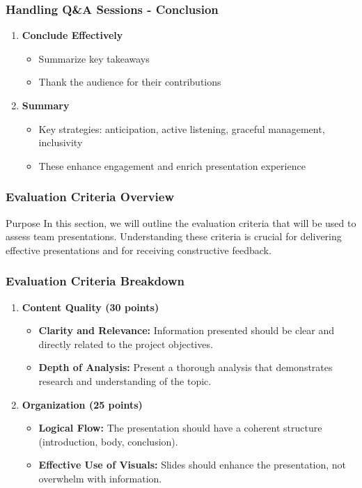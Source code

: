 \documentclass[aspectratio=169]{beamer}
\begin{document}
\begin{frame}[fragile]
    \frametitle{Handling Q\&A Sessions - Conclusion}
    \begin{enumerate}
        \item \textbf{Conclude Effectively}
            \begin{itemize}
                \item Summarize key takeaways
                \item Thank the audience for their contributions
            \end{itemize}
        \item \textbf{Summary}
            \begin{itemize}
                \item Key strategies: anticipation, active listening, graceful management, inclusivity
                \item These enhance engagement and enrich presentation experience
            \end{itemize}
    \end{enumerate}
\end{frame}

\begin{frame}[fragile]
    \frametitle{Evaluation Criteria Overview}
    \begin{block}{Purpose}
        In this section, we will outline the evaluation criteria that will be used to assess team presentations. 
        Understanding these criteria is crucial for delivering effective presentations and for receiving constructive feedback.
    \end{block}
\end{frame}

\begin{frame}[fragile]
    \frametitle{Evaluation Criteria Breakdown}
    \begin{enumerate}
        \item \textbf{Content Quality (30 points)}
        \begin{itemize}
            \item \textbf{Clarity and Relevance:} Information presented should be clear and directly related to the project objectives.
            \item \textbf{Depth of Analysis:} Present a thorough analysis that demonstrates research and understanding of the topic.
        \end{itemize}

        \item \textbf{Organization (25 points)}
        \begin{itemize}
            \item \textbf{Logical Flow:} The presentation should have a coherent structure (introduction, body, conclusion).
            \item \textbf{Effective Use of Visuals:} Slides should enhance the presentation, not overwhelm with information.
        \end{itemize}
    \end{enumerate}
\end{frame}
\end{document}
